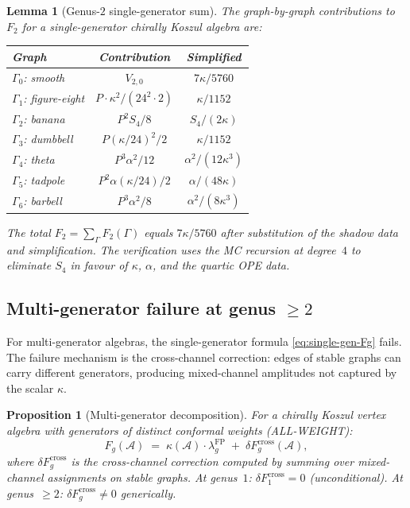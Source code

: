 \documentclass[11pt,reqno]{amsart}
\newtheorem{proposition}[theorem]{Proposition}
\newtheorem{lemma}[theorem]{Lemma}
\theoremstyle{definition}
\theoremstyle{remark}
\newcommand{\cA}{\mathcal{A}}
\numberwithin{equation}{section}
\begin{document}
\begin{lemma}[Genus-$2$ single-generator
sum]\label{lem:genus2-single}
The graph-by-graph contributions to $F_2$ for a
single-generator chirally Koszul algebra are:
\begin{center}
\renewcommand{\arraystretch}{1.3}
\begin{tabular}{lcc}
\toprule
Graph & Contribution & Simplified \\
\midrule
$\Gamma_0$: smooth
 & $V_{2,0}$ & $7\kappa/5760$ \\
$\Gamma_1$: figure-eight
 & $P \cdot \kappa^2/(24^2 \cdot 2)$
 & $\kappa/1152$ \\
$\Gamma_2$: banana
 & $P^2 S_4/8$ & $S_4/(2\kappa)$ \\
$\Gamma_3$: dumbbell
 & $P(\kappa/24)^2/2$
 & $\kappa/1152$ \\
$\Gamma_4$: theta
 & $P^3 \alpha^2/12$ & $\alpha^2/(12\kappa^3)$ \\
$\Gamma_5$: tadpole
 & $P^2 \alpha (\kappa/24)/2$
 & $\alpha/(48\kappa)$ \\
$\Gamma_6$: barbell
 & $P^3 \alpha^2/8$ & $\alpha^2/(8\kappa^3)$ \\
\bottomrule
\end{tabular}
\end{center}
The total $F_2 = \sum_\Gamma F_2(\Gamma)$ equals
$7\kappa/5760$ after substitution of the shadow data and
simplification. The verification uses the MC recursion at
degree~$4$ to eliminate $S_4$ in favour of
$\kappa$, $\alpha$, and the quartic OPE data.
\end{lemma}

\subsection{Multi-generator failure at genus
$\ge 2$}\label{subsec:multi-gen}

For multi-generator algebras, the single-generator formula
\eqref{eq:single-gen-Fg} fails. The failure mechanism is
the cross-channel correction: edges of stable graphs can
carry different generators, producing mixed-channel
amplitudes not captured by the scalar $\kappa$.

\begin{proposition}[Multi-generator
decomposition]\label{prop:multi-gen}
For a chirally Koszul vertex algebra with generators of
distinct conformal weights
\textup{(}ALL-WEIGHT\textup{)}:
\begin{equation}\label{eq:multi-gen-Fg}
 F_g(\cA) \;=\; \kappa(\cA) \cdot
 \lambda_g^{\mathrm{FP}}
 \;+\; \delta F_g^{\mathrm{cross}}(\cA),
\end{equation}
where $\delta F_g^{\mathrm{cross}}$ is the cross-channel
correction computed by summing over mixed-channel
assignments on stable graphs. At genus~$1$:
$\delta F_1^{\mathrm{cross}} = 0$ (unconditional). At
genus~$\ge 2$: $\delta F_g^{\mathrm{cross}} \ne 0$
generically.
\end{proposition}
\end{document}
